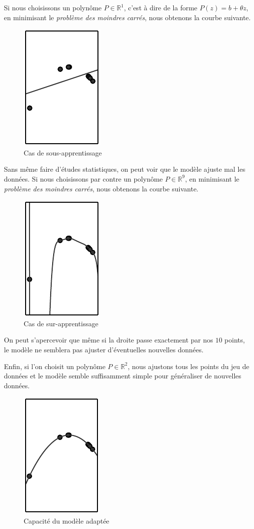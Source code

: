 \documentclass[a4paper, 11pt]{report}
\begin{document}
			
Si nous choisissons un polynôme $P \in \mathbb{R}^1$, c'est à dire de la forme $P(z) = b + \theta z$, en minimisant le \emph{problème des moindres carrés}, nous obtenons la courbe suivante.
\begin{figure}[H]
	\centering
	\includegraphics[scale=0.5]{Images/Underfitting.png}
	\caption{Cas de sous-apprentissage}			
\end{figure}
Sans même faire d'études statistiques, on peut voir que le modèle ajuste mal les données.
Si nous choisissons par contre un polynôme $P \in \mathbb{R}^9$, en minimisant le \emph{problème des moindres carrés}, nous obtenons la courbe suivante.
\begin{figure}[H]
	\centering
	\includegraphics[scale=0.5]{Images/Overfitting.png}
	\caption{Cas de sur-apprentissage}
\end{figure}
On peut s'apercevoir que même si la droite passe exactement par nos $10$ points, le modèle ne semblera pas ajuster d'éventuelles nouvelles données.
			
Enfin, si l'on choisit un polynôme $P \in \mathbb{R}^2$, nous ajustons tous les points du jeu de données et le modèle semble suffisamment simple pour généraliser de nouvelles données.
\begin{figure}[H]
	\centering
	\includegraphics[scale=0.5]{Images/Good_Fitting.png}
	\caption{Capacité du modèle adaptée}
\end{figure}
		
\end{document}
